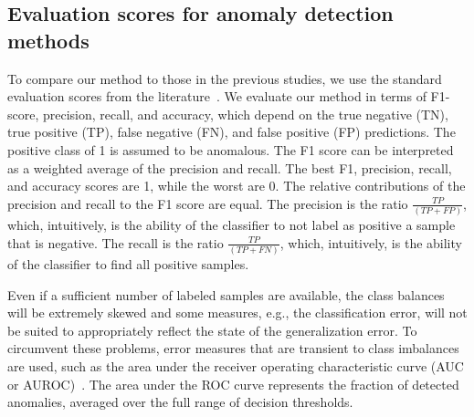 \subsection{Evaluation scores for anomaly detection methods}
\label{ch:background:sec:anomalydetection:subsec:deepanomaly:subsubsec:evaluationmethods}
To compare our method to those in the previous studies, we use the standard evaluation scores from the literature~\cite{ruff2020unifying, pang2020deep}. We evaluate our method in terms of F1-score, precision, recall, and accuracy, which depend on the true negative (TN), true positive (TP), false negative (FN), and false positive (FP) predictions. The positive class of 1 is assumed to be anomalous. The F1 score can be interpreted as a weighted average of the precision and recall. The best F1, precision, recall, and accuracy scores are 1, while the worst are 0. The relative contributions of the precision and recall to the F1 score are equal. The precision is the ratio $\frac{TP}{(TP + FP)}$, which, intuitively, is the ability of the classifier to not label as positive a sample that is negative. The recall is the ratio $\frac{TP}{(TP + FN)}$, which, intuitively, is the ability of the classifier to find all positive samples.

Even if a sufficient number of labeled samples are available, the class balances will be extremely skewed and some measures, e.g., the classification error, will not be suited to appropriately reflect the state of the generalization error. To circumvent these problems, error measures that are transient to class imbalances are used, such as the area under the receiver operating characteristic curve (AUC or AUROC)~\cite{campos2016evaluation}. The area under the
ROC curve represents the fraction of detected anomalies, averaged over the full range of decision thresholds.

